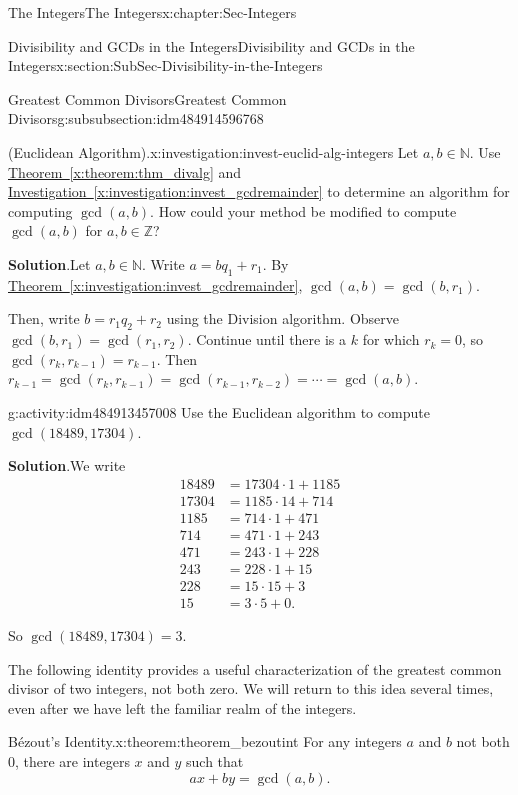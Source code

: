 \documentclass[oneside,10pt,]{book}
\newcommand{\blocktitlefont}{\relax}
\newcommand{\xreffont}{\relax}
\numberwithin{equation}{section}
\def\Z{{\mathbb Z}}
\def\N{{\mathbb N}}
\newcommand{\amp}{&}
\begin{document}
\begin{chapterptx}{The Integers}{}{The Integers}{}{}{x:chapter:Sec-Integers}
\begin{sectionptx}{Divisibility and GCDs in the Integers}{}{Divisibility and GCDs in the Integers}{}{}{x:section:SubSec-Divisibility-in-the-Integers}
\begin{subsubsectionptx}{Greatest Common Divisors}{}{Greatest Common Divisors}{}{}{g:subsubsection:idm484914596768}
\begin{investigation}{(Euclidean Algorithm).}{x:investigation:invest-euclid-alg-integers}
Let \(a,b\in \N\). Use \hyperref[x:theorem:thm_divalg]{Theorem~{\xreffont\ref{x:theorem:thm_divalg}}} and \hyperref[x:investigation:invest_gcdremainder]{Investigation~{\xreffont\ref{x:investigation:invest_gcdremainder}}} to determine an algorithm for computing \(\gcd(a,b)\). How could your method be modified to compute \(\gcd(a,b)\) for \(a,b\in\Z\)?%
\par\smallskip%
\noindent\textbf{\blocktitlefont Solution}.\hypertarget{g:solution:idm484913461808}{}\quad{}Let \(a,b\in \N\). Write \(a = bq_1+r_1\). By \hyperref[x:investigation:invest_gcdremainder]{Theorem~{\xreffont\ref{x:investigation:invest_gcdremainder}}}, \(\gcd(a,b) = \gcd(b,r_1)\).%
\par
Then, write \(b = r_1 q_2 + r_2\) using the Division algorithm. Observe \(\gcd(b,r_1) = \gcd(r_1,r_2)\). Continue until there is a \(k\) for which \(r_k = 0\), so \(\gcd(r_k,r_{k-1}) = r_{k-1}\). Then \(r_{k-1}= \gcd(r_k, r_{k-1}) = \gcd(r_{k-1},r_{k-2}) = \cdots = \gcd(a,b)\).%
\end{investigation}
\begin{activity}{}{g:activity:idm484913457008}%
Use the Euclidean algorithm to compute \(\gcd(18489,17304)\).%
\par\smallskip%
\noindent\textbf{\blocktitlefont Solution}.\hypertarget{g:solution:idm484913396448}{}\quad{}We write%
\begin{align*}
18489 \amp = 17304 \cdot 1 +1185\\
17304 \amp = 1185\cdot 14 +714\\
1185 \amp = 714 \cdot 1 + 471\\
714 \amp = 471 \cdot 1+ 243\\
471 \amp = 243\cdot 1 + 228\\
243 \amp = 228 \cdot 1+ 15\\
228 \amp = 15 \cdot 15 + 3\\
15 \amp = 3\cdot 5 + 0\text{.}
\end{align*}
%
\par
So \(\gcd(18489,17304)=3\).%
\end{activity}
The following identity provides a useful characterization of the greatest common divisor of two integers, not both zero. We will return to this idea several times, even after we have left the familiar realm of the integers.%
\begin{theorem}{Bézout's Identity.}{}{x:theorem:theorem_bezoutint}%
%
For any integers \(a\) and \(b\) not both 0, there are integers \(x\) and \(y\) such that%
\begin{equation*}
ax + by = \gcd(a,b)\text{.}
\end{equation*}
%


\end{theorem}
\end{subsubsectionptx}
\end{sectionptx}
\end{chapterptx}
\end{document}
